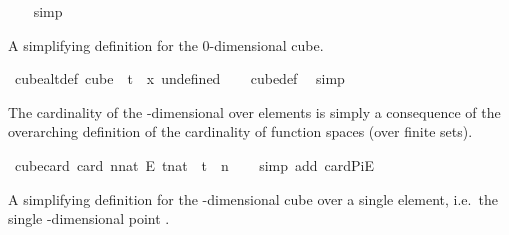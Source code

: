 \begin{isabellebody}
\ \ \isamarkupfalse%
\ simp%
\endisatagproof
{\isafoldproof}%
%
\isadelimproof
%
\endisadelimproof
%
\begin{isamarkuptext}%
A simplifying definition for the 0-dimensional cube.%
\end{isamarkuptext}\isamarkuptrue%
\isamarkupfalse%
\ cube{}{\isacharunderscore}{\kern0pt}alt{\isacharunderscore}{\kern0pt}def{\isacharcolon}{\kern0pt}\ {\isachardoublequoteopen}cube\ {}\ t\ {\isacharequal}{\kern0pt}\ {\isacharbraceleft}{\kern0pt}{\isasymlambda}x{\isachardot}{\kern0pt}\ undefined{\isacharbraceright}{\kern0pt}{\isachardoublequoteclose}\isanewline
%
\isadelimproof
\ \ %
\endisadelimproof
%
\isatagproof
{}\isamarkupfalse%
\ cube{\isacharunderscore}{\kern0pt}def\ \isamarkupfalse%
\ simp%
\endisatagproof
{\isafoldproof}%
%
\isadelimproof
%
\endisadelimproof
%
\begin{isamarkuptext}%
The cardinality of the -dimensional over  elements is simply a consequence of the overarching definition of the cardinality of function spaces (over finite sets).%
\end{isamarkuptext}\isamarkuptrue%
\isamarkupfalse%
\ cube{\isacharunderscore}{\kern0pt}card{\isacharcolon}{\kern0pt}\ {\isachardoublequoteopen}card\ {\isacharparenleft}{\kern0pt}{\isacharbraceleft}{\kern0pt}{\isachardot}{\kern0pt}{\isachardot}{\kern0pt}{\isacharless}{\kern0pt}n{\isacharcolon}{\kern0pt}{\isacharcolon}{\kern0pt}nat{\isacharbraceright}{\kern0pt}\ {\isasymrightarrow}\isactrlsub E\ {\isacharbraceleft}{\kern0pt}{\isachardot}{\kern0pt}{\isachardot}{\kern0pt}{\isacharless}{\kern0pt}t{\isacharcolon}{\kern0pt}{\isacharcolon}{\kern0pt}nat{\isacharbraceright}{\kern0pt}{\isacharparenright}{\kern0pt}\ {\isacharequal}{\kern0pt}\ t\ {\isacharcircum}{\kern0pt}\ n{\isachardoublequoteclose}\isanewline
%
\isadelimproof
\ \ %
\endisadelimproof
%
\isatagproof
{}\isamarkupfalse%
\ {\isacharparenleft}{\kern0pt}simp\ add{\isacharcolon}{\kern0pt}\ card{\isacharunderscore}{\kern0pt}PiE{\isacharparenright}{\kern0pt}%
\endisatagproof
{\isafoldproof}%
%
\isadelimproof
%
\endisadelimproof
%
\begin{isamarkuptext}%
A simplifying definition for the -dimensional cube over a single element, i.e.\ the single -dimensional point .%
\end{isamarkuptext}\isamarkuptrue%

\end{isabellebody}
